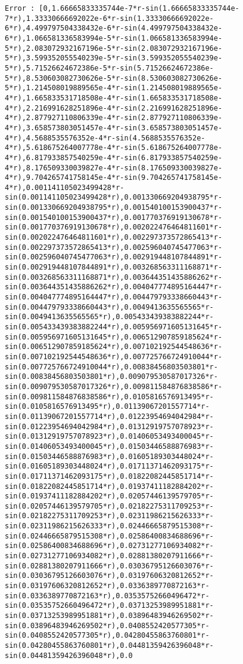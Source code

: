 \documentclass[
]{book}
\begin{document}
\begin{verbatim}
Error : [0,1.66665833335744e-7*r-sin(1.66665833335744e-7*r),1.33330666692022e-6*r-sin(1.33330666692022e-6*r),4.499797504338432e-6*r-sin(4.499797504338432e-6*r),1.066581336583994e-5*r-sin(1.066581336583994e-5*r),2.083072932167196e-5*r-sin(2.083072932167196e-5*r),3.599352055540239e-5*r-sin(3.599352055540239e-5*r),5.71526624672386e-5*r-sin(5.71526624672386e-5*r),8.530603082730626e-5*r-sin(8.530603082730626e-5*r),1.214508019889565e-4*r-sin(1.214508019889565e-4*r),1.665833531718508e-4*r-sin(1.665833531718508e-4*r),2.216991628251896e-4*r-sin(2.216991628251896e-4*r),2.877927110806339e-4*r-sin(2.877927110806339e-4*r),3.658573803051457e-4*r-sin(3.658573803051457e-4*r),4.5688535576352e-4*r-sin(4.5688535576352e-4*r),5.618675264007778e-4*r-sin(5.618675264007778e-4*r),6.817933857540259e-4*r-sin(6.817933857540259e-4*r),8.176509330039827e-4*r-sin(8.176509330039827e-4*r),9.704265741758145e-4*r-sin(9.704265741758145e-4*r),0.001141105023499428*r-sin(0.001141105023499428*r),0.001330669204938795*r-sin(0.001330669204938795*r),0.001540100153900437*r-sin(0.001540100153900437*r),0.001770376919130678*r-sin(0.001770376919130678*r),0.002022476464811601*r-sin(0.002022476464811601*r),0.002297373572865413*r-sin(0.002297373572865413*r),0.002596040745477063*r-sin(0.002596040745477063*r),0.002919448107844891*r-sin(0.002919448107844891*r),0.003268563311168871*r-sin(0.003268563311168871*r),0.003644351435886262*r-sin(0.003644351435886262*r),0.004047774895164447*r-sin(0.004047774895164447*r),0.004479793338660443*r-sin(0.004479793338660443*r),0.0049413635565565*r-sin(0.0049413635565565*r),0.005433439383882244*r-sin(0.005433439383882244*r),0.005956971605131645*r-sin(0.005956971605131645*r),0.006512907859185624*r-sin(0.006512907859185624*r),0.007102192544548636*r-sin(0.007102192544548636*r),0.007725766724910044*r-sin(0.007725766724910044*r),0.00838456803503801*r-sin(0.00838456803503801*r),0.009079530587017326*r-sin(0.009079530587017326*r),0.009811584876838586*r-sin(0.009811584876838586*r),0.0105816576913495*r-sin(0.0105816576913495*r),0.01139067201557714*r-sin(0.01139067201557714*r),0.01223954694042984*r-sin(0.01223954694042984*r),0.01312919757078923*r-sin(0.01312919757078923*r),0.01406053493400045*r-sin(0.01406053493400045*r),0.01503446588876983*r-sin(0.01503446588876983*r),0.01605189303448024*r-sin(0.01605189303448024*r),0.01711371462093175*r-sin(0.01711371462093175*r),0.01822082445851714*r-sin(0.01822082445851714*r),0.01937411182884202*r-sin(0.01937411182884202*r),0.02057446139579705*r-sin(0.02057446139579705*r),0.02182275311709253*r-sin(0.02182275311709253*r),0.02311986215626333*r-sin(0.02311986215626333*r),0.02446665879515308*r-sin(0.02446665879515308*r),0.02586400834688696*r-sin(0.02586400834688696*r),0.02731277106934082*r-sin(0.02731277106934082*r),0.02881380207911666*r-sin(0.02881380207911666*r),0.03036795126603076*r-sin(0.03036795126603076*r),0.03197606320812652*r-sin(0.03197606320812652*r),0.0336389770872163*r-sin(0.0336389770872163*r),0.03535752660496472*r-sin(0.03535752660496472*r),0.03713253989951881*r-sin(0.03713253989951881*r),0.03896483946269502*r-sin(0.03896483946269502*r),0.0408552420577305*r-sin(0.0408552420577305*r),0.04280455863760801*r-sin(0.04280455863760801*r),0.04481359426396048*r-sin(0.04481359426396048*r),0.0
\end{verbatim}
\end{document}
